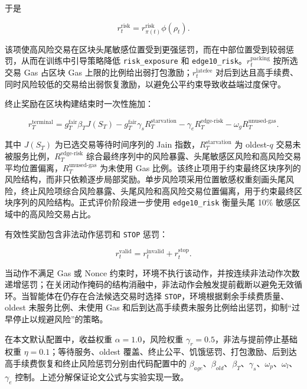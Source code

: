 于是

\begin{equation}
  r_t^{\text{risk}} = r_{\pi(t)}^{\text{risk}}\phi(\rho_t).
\end{equation}

该项使高风险交易在区块头尾敏感位置受到更强惩罚，而在中部位置受到较弱惩罚，从而在训练中引导策略降低 \texttt{risk\_exposure} 和 \texttt{edge10\_risk}。$r_t^{\text{packing}}$ 按所选交易 Gas 占区块 Gas 上限的比例给出弱打包激励；$r_t^{\text{latefee}}$ 对后到达且高手续费、同时风险较低的交易给出弱恢复激励，以避免公平约束导致收益端过度保守。

终止奖励在区块构建结束时一次性施加：

\begin{equation}
  r_T^{\text{terminal}}
  =
  g_T^{\text{fair}}\beta_T J(S_T)
  - g_T^{\text{fair}}\gamma_s R_T^{\text{starvation}}
  - \gamma_e R_T^{\text{edge-risk}}
  - \omega_g R_T^{\text{unused-gas}} .
\end{equation}

其中 $J(S_T)$ 为已选交易等待时间序列的 Jain 指数，$R_T^{\text{starvation}}$ 为 oldest-$q$ 交易未被服务比例，$R_T^{\text{edge-risk}}$ 综合最终序列中的风险暴露、头尾敏感区风险和高风险交易平均位置偏离，$R_T^{\text{unused-gas}}$ 为未使用 Gas 比例。该终止项用于约束最终区块序列的风险结构，而非只依赖逐步局部奖励。单步风险项采用位置敏感权重刻画头尾风险，终止风险项综合风险暴露、头尾风险和高风险交易位置偏离，用于约束最终区块序列的风险结构。正式评价阶段进一步使用 \texttt{edge10\_risk} 衡量头尾 10\% 敏感区域中的高风险交易占比。

有效性奖励包含非法动作惩罚和 \texttt{STOP} 惩罚：

\begin{equation}
  r_t^{\text{valid}} = r_t^{\text{invalid}} + r_t^{\text{stop}} .
\end{equation}

当动作不满足 Gas 或 Nonce 约束时，环境不执行该动作，并按连续非法动作次数递增惩罚；在关闭动作掩码的结构消融中，非法动作会触发提前截断以避免无效循环。当智能体在仍存在合法候选交易时选择 \texttt{STOP}，环境根据剩余手续费质量、oldest 未服务比例、未使用 Gas 和后到达高手续费未服务比例给出惩罚，抑制“过早停止以规避风险”的策略。

在本文默认配置中，收益权重 $\alpha=1.0$，风险权重 $\gamma_r=0.5$，非法与提前停止基础权重 $\eta=0.1$；等待服务、oldest 覆盖、终止公平、饥饿惩罚、打包激励、后到达高手续费恢复和终止风险惩罚分别由代码配置中的 $\beta_{age}$、$\beta_{old}$、$\beta_T$、$\gamma_s$、$\omega_p$、$\omega_l$、$\gamma_e$ 控制。上述分解保证论文公式与实验实现一致。

